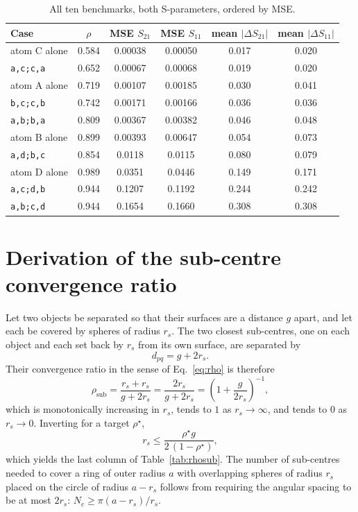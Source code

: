 \documentclass[11pt,a4paper]{article}
\theoremstyle{plain}
\theoremstyle{definition}
\begin{document}
\begin{table}[htbp]
\centering\small
\caption{All ten benchmarks, both S-parameters, ordered by MSE.}
\label{tab:full}
\begin{tabular}{@{}lccccc@{}}
\toprule
Case & $\rho$ & MSE $S_{21}$ & MSE $S_{11}$ & mean $|\Delta S_{21}|$ & mean $|\Delta S_{11}|$ \\
\midrule
atom C alone     & 0.584 & 0.00038 & 0.00050 & 0.017 & 0.020 \\
\texttt{a,c;c,a} & 0.652 & 0.00067 & 0.00068 & 0.019 & 0.020 \\
atom A alone     & 0.719 & 0.00107 & 0.00185 & 0.030 & 0.041 \\
\texttt{b,c;c,b} & 0.742 & 0.00171 & 0.00166 & 0.036 & 0.036 \\
\texttt{a,b;b,a} & 0.809 & 0.00367 & 0.00382 & 0.046 & 0.048 \\
atom B alone     & 0.899 & 0.00393 & 0.00647 & 0.054 & 0.073 \\
\texttt{a,d;b,c} & 0.854 & 0.0118  & 0.0115  & 0.080 & 0.079 \\
atom D alone     & 0.989 & 0.0351  & 0.0446  & 0.149 & 0.171 \\
\texttt{a,c;d,b} & 0.944 & 0.1207  & 0.1192  & 0.244 & 0.242 \\
\texttt{a,b;c,d} & 0.944 & 0.1654  & 0.1660  & 0.308 & 0.308 \\
\bottomrule
\end{tabular}
\end{table}

\section{Derivation of the sub-centre convergence ratio}
\label{app:rhosub}

Let two objects be separated so that their surfaces are a distance $g$ apart, and
let each be covered by spheres of radius $r_s$. The two closest sub-centres, one
on each object and each set back by $r_s$ from its own surface, are separated by
\begin{equation}
  d_{pq} = g + 2 r_s .
\end{equation}
Their convergence ratio in the sense of Eq.~\eqref{eq:rho} is therefore
\begin{equation}
  \rho_{\text{sub}} = \frac{r_s + r_s}{g + 2 r_s}
                    = \frac{2 r_s}{g + 2 r_s}
                    = \left(1 + \frac{g}{2 r_s}\right)^{-1},
\end{equation}
which is monotonically increasing in $r_s$, tends to $1$ as $r_s \to \infty$, and
tends to $0$ as $r_s \to 0$. Inverting for a target $\rho^\star$,
\begin{equation}
  r_s \le \frac{\rho^\star g}{2\,(1 - \rho^\star)} ,
\end{equation}
which yields the last column of Table~\ref{tab:rhosub}. The number of
sub-centres needed to cover a ring of outer radius $a$ with overlapping spheres
of radius $r_s$ placed on the circle of radius $a - r_s$ follows from requiring
the angular spacing to be at most $2 r_s$:
$N_c \ge \pi (a - r_s)/r_s$.
\end{document}
